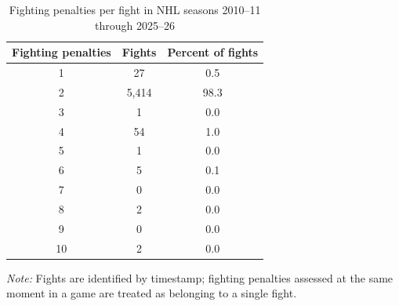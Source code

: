 \begin{table}[!h]
\centering
\caption{Fighting penalties per fight in NHL seasons 2010--11 through 2025--26}
\label{tab:fight_penalty_distribution}
\small
\renewcommand{\arraystretch}{1.12}
\setlength{\tabcolsep}{6pt}

\begin{tabular*}{0.62\textwidth}{@{\extracolsep{\fill}}ccc}
\toprule
Fighting penalties & Fights & Percent of fights \\
\midrule
1 & 27 & 0.5 \\
2 & 5,414 & 98.3 \\
3 & 1 & 0.0 \\
4 & 54 & 1.0 \\
5 & 1 & 0.0 \\
6 & 5 & 0.1 \\
7 & 0 & 0.0 \\
8 & 2 & 0.0 \\
9 & 0 & 0.0 \\
10 & 2 & 0.0 \\
\bottomrule
\end{tabular*}

\vspace{0.4em}
\parbox{0.62\textwidth}{
\footnotesize
\textit{Note:} Fights are identified by timestamp; fighting penalties assessed at the same moment in a game are treated as belonging to a single fight.
}
\end{table}
